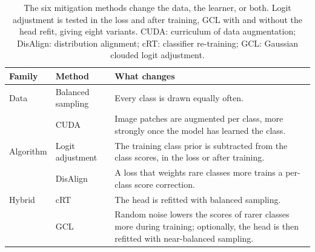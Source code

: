 \documentclass[11pt]{article}
\begin{document}
\begin{table}[!htb]
\centering\small
\begin{tabular}{@{}llp{}@{}}
\toprule
Family & Method & What changes \\
\midrule
Data & Balanced sampling \citep{kang2020decouplingRepresentation} & Every class is drawn equally often. \\
 & CUDA \citep{ahn2023cuda} & Image patches are augmented per class, more strongly once the model has learned the class. \\
\addlinespace
Algorithm & Logit adjustment \citep{menon2021longTail} & The training class prior is subtracted from the class scores, in the loss or after training. \\
 & DisAlign \citep{zhang2021distributionAlignment} & A loss that weights rare classes more trains a per-class score correction. \\
\addlinespace
Hybrid & cRT \citep{kang2020decouplingRepresentation} & The head is refitted with balanced sampling. \\
 & GCL \citep{li2022gaussianClouded} & Random noise lowers the scores of rarer classes more during training; optionally, the head is then refitted with near-balanced sampling. \\
\bottomrule
\end{tabular}
\caption{The six mitigation methods change the data, the learner, or both. Logit adjustment is tested in the loss and after training, GCL with and without the head refit, giving eight variants. CUDA: curriculum of data augmentation; DisAlign: distribution alignment; cRT: classifier re-training; GCL: Gaussian clouded logit adjustment.}
\label{tab:methods}
\end{table}
\end{document}
